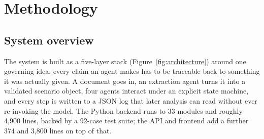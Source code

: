 \chapter{Methodology}
\label{ch:methodology}

\section{System overview}
\label{sec:overview}

The system is built as a five-layer stack (Figure~\ref{fig:architecture}) around
one governing idea: every claim an agent makes has to be traceable back to
something it was actually given. A document goes in, an extraction agent turns it
into a validated scenario object, four agents interact under an explicit state
machine, and every step is written to a JSON log that later analysis can read
without ever re-invoking the model. The Python backend runs to 33 modules and
roughly 4,900 lines, backed by a 92-case test suite; the API and frontend add a
further 374 and 3,800 lines on top of that.

